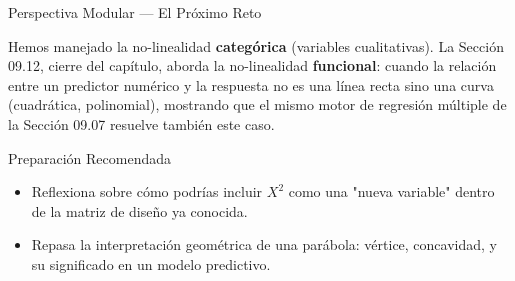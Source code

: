 \documentclass[10pt, aspectratio=169]{beamer}
\begin{document}
\begin{frame}{Perspectiva Modular --- El Próximo Reto}
  \scriptsize
  \begin{retoclase}
    Hemos manejado la no-linealidad \textbf{categórica} (variables cualitativas). La Sección 09.12, cierre del capítulo, aborda la no-linealidad \textbf{funcional}: cuando la relación entre un predictor numérico y la respuesta no es una línea recta sino una curva (cuadrática, polinomial), mostrando que el mismo motor de regresión múltiple de la Sección 09.07 resuelve también este caso.
  \end{retoclase}

  \vspace{0.08cm}
  \pause
  \begin{alertblock}{Preparación Recomendada}
    \begin{itemize}\itemsep=0.06cm
      \item Reflexiona sobre cómo podrías incluir $X^2$ como una "nueva variable" dentro de la matriz de diseño ya conocida.
      \item Repasa la interpretación geométrica de una parábola: vértice, concavidad, y su significado en un modelo predictivo.
    \end{itemize}
  \end{alertblock}
\end{frame}
\end{document}

